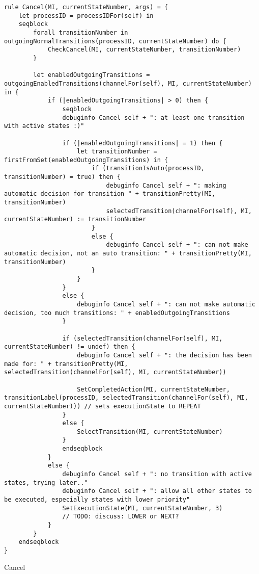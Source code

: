 \begin{listing}[H]
\begin{verbatim}
rule Cancel(MI, currentStateNumber, args) = {
    let processID = processIDFor(self) in
    seqblock
        forall transitionNumber in outgoingNormalTransitions(processID, currentStateNumber) do {
            CheckCancel(MI, currentStateNumber, transitionNumber)
        }

        let enabledOutgoingTransitions = outgoingEnabledTransitions(channelFor(self), MI, currentStateNumber) in {
            if (|enabledOutgoingTransitions| > 0) then {
                seqblock
                debuginfo Cancel self + ": at least one transition with active states :)"

                if (|enabledOutgoingTransitions| = 1) then {
                    let transitionNumber = firstFromSet(enabledOutgoingTransitions) in {
                        if (transitionIsAuto(processID, transitionNumber) = true) then {
                            debuginfo Cancel self + ": making automatic decision for transition " + transitionPretty(MI, transitionNumber)
                            selectedTransition(channelFor(self), MI, currentStateNumber) := transitionNumber
                        }
                        else {
                            debuginfo Cancel self + ": can not make automatic decision, not an auto transition: " + transitionPretty(MI, transitionNumber)
                        }
                    }
                }
                else {
                    debuginfo Cancel self + ": can not make automatic decision, too much transitions: " + enabledOutgoingTransitions
                }

                if (selectedTransition(channelFor(self), MI, currentStateNumber) != undef) then {
                    debuginfo Cancel self + ": the decision has been made for: " + transitionPretty(MI, selectedTransition(channelFor(self), MI, currentStateNumber))

                    SetCompletedAction(MI, currentStateNumber, transitionLabel(processID, selectedTransition(channelFor(self), MI, currentStateNumber))) // sets executionState to REPEAT
                }
                else {
                    SelectTransition(MI, currentStateNumber)
                }
                endseqblock
            }
            else {
                debuginfo Cancel self + ": no transition with active states, trying later.."
                debuginfo Cancel self + ": allow all other states to be executed, especially states with lower priority"
                SetExecutionState(MI, currentStateNumber, 3)
                // TODO: discuss: LOWER or NEXT?
            }
        }
    endseqblock
}
\end{verbatim}
\caption{Cancel}
\label{lst:asm:Cancel}
\end{listing}




